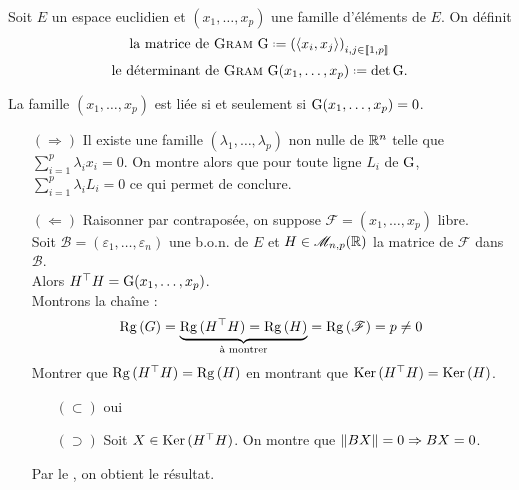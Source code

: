 \begin{defi}
    Soit $E$ un espace euclidien et $(x_1, \dots, x_p)$ une famille d'éléments de $E$. On définit
    $$\text{la matrice de \textsc{Gram} } \Gram \defeq \left( \langle x_i, x_j \rangle \right)_{i,j \in \llbracket 1, p \rrbracket}$$
    $$\text{le déterminant de \textsc{Gram} } \Gram(x_1, \dots, x_p) \defeq \det \Gram.$$
\end{defi}


\begin{prop}
     La famille $(x_1, \dots, x_p)$ est liée si et seulement si $\mathrm{G}(x_1, \dots, x_p) = 0$.
\end{prop}

\begin{preuve}
    \begin{itemize}
        \item[$(\Rightarrow)$] Il existe une famille $(\lambda_1, \dots, \lambda_p)$ non nulle  de $\mathbb{R}^n$ telle que $\sum\limits_{i=1}^{p} \lambda_i x_i = 0$. On montre alors que pour toute ligne $L_i$ de $\mathrm{G}$, $\sum\limits_{i=1}^{p} \lambda_i L_i = 0$ ce qui permet de conclure.
        \item[$(\Leftarrow)$] Raisonner par contraposée, on suppose $\mathscr{F} = (x_1, \dots, x_p)$ libre. \\
        Soit $\mathscr{B} = (\varepsilon_1, \dots, \varepsilon_n)$ une b.o.n. de $E$ et $H \in \mathscr{M}_{n, p} (\mathbb{R})$ la matrice de $\mathscr{F}$ dans $\mathscr{B}$. \\
        Alors $H^\top H = \mathrm{G}(x_1, \dots, x_p)$. \\
        Montrons la chaîne :
        $$\mathrm{Rg}\,(G) = \underbrace{\mathrm{Rg}\,(H^\top H) = \mathrm{Rg}\,(H)}_{\text{à montrer}} = \mathrm{Rg}\,(\mathscr{F}) = p \not= 0$$
        Montrer que $\mathrm{Rg}\,(H^\top H) = \mathrm{Rg}\,(H)$ en montrant que $\mathrm{Ker}\,(H^\top H) = \mathrm{Ker}\,(H)$. 
        \begin{itemize}
            \item[$(\subset)$] oui
            \item[$(\supset)$] Soit $X \in \mathrm{Ker}\,(H^\top H)$. On montre que $\Vert BX \Vert = 0 \Rightarrow BX = 0$. 
        \end{itemize}
        Par le , on obtient le résultat. 
    \end{itemize}
\end{preuve}

